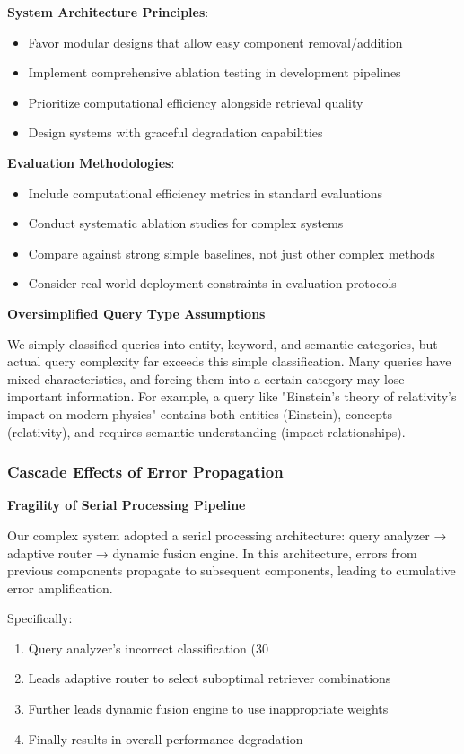 \documentclass[letterpaper]{article} %
\begin{document}
\textbf{System Architecture Principles}:
\begin{itemize}
\item Favor modular designs that allow easy component removal/addition
\item Implement comprehensive ablation testing in development pipelines
\item Prioritize computational efficiency alongside retrieval quality
\item Design systems with graceful degradation capabilities
\end{itemize}

\textbf{Evaluation Methodologies}:
\begin{itemize}
\item Include computational efficiency metrics in standard evaluations
\item Conduct systematic ablation studies for complex systems
\item Compare against strong simple baselines, not just other complex methods
\item Consider real-world deployment constraints in evaluation protocols
\end{itemize}

\textbf{Oversimplified Query Type Assumptions}

We simply classified queries into entity, keyword, and semantic categories, but actual query complexity far exceeds this simple classification. Many queries have mixed characteristics, and forcing them into a certain category may lose important information. For example, a query like "Einstein's theory of relativity's impact on modern physics" contains both entities (Einstein), concepts (relativity), and requires semantic understanding (impact relationships).

\subsubsection{Cascade Effects of Error Propagation}

\textbf{Fragility of Serial Processing Pipeline}

Our complex system adopted a serial processing architecture: query analyzer → adaptive router → dynamic fusion engine. In this architecture, errors from previous components propagate to subsequent components, leading to cumulative error amplification.

Specifically:
\begin{enumerate}
\item Query analyzer's incorrect classification (30%
\item Leads adaptive router to select suboptimal retriever combinations
\item Further leads dynamic fusion engine to use inappropriate weights
\item Finally results in overall performance degradation
\end{enumerate}
\end{document}
